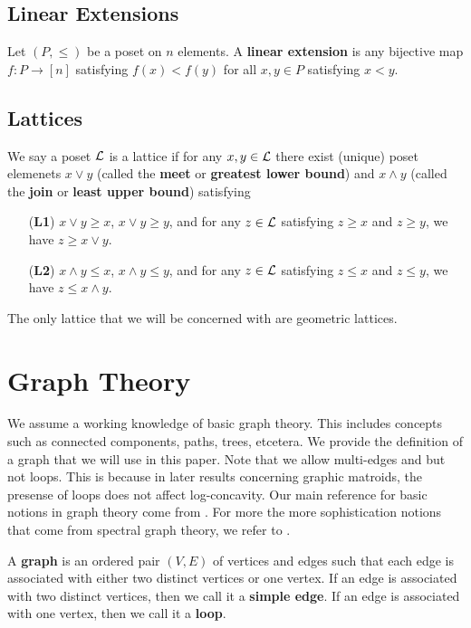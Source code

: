 \documentclass{puthesis-UG}
\begin{document}
\subsection{Linear Extensions}

\begin{defn}
	Let $(P, \leq)$ be a poset on $n$ elements. A \textbf{linear extension} is any bijective map $f : P \to [n]$ satisfying $f(x) < f(y)$ for all $x, y \in P$ satisfying $x < y$.
\end{defn}
\subsection{Lattices}

\begin{defn}
	We say a poset $\mathcal{L}$ is a lattice if for any $x, y \in \mathcal{L}$ there exist (unique) poset elemenets $x \vee y$ (called the \textbf{meet} or \textbf{greatest lower bound}) and $x \wedge y$ (called the \textbf{join} or \textbf{least upper bound}) satisfying 
	\begin{enumerate}
		\item[(\textbf{L1})] $x \vee y \geq x$, $x \vee y \geq y$, and for any $z \in \mathcal{L}$ satisfying $z \geq x$ and $z \geq y$, we have $z \geq x \vee y$. 
		\item[(\textbf{L2})] $x \wedge y \leq x$, $x \wedge y \leq y$, and for any $z \in \mathcal{L}$ satisfying $z \leq x$ and $z \leq y$, we have $z \leq x \wedge y$. 
	\end{enumerate}
\end{defn}

The only lattice that we will be concerned with are geometric lattices. 
\section{Graph Theory}

We assume a working knowledge of basic graph theory. This includes concepts such as connected components, paths, trees, etcetera. We provide the definition of a graph that we will use in this paper. Note that we allow multi-edges and but not loops. This is because in later results concerning graphic matroids, the presense of loops does not affect log-concavity. Our main reference for basic notions in graph theory come from \cite{diestel}. For more the more sophistication notions that come from spectral graph theory, we refer to \cite{chung-spectral-graph-theory}. 

\begin{defn}
	A \textbf{graph} is an ordered pair $(V, E)$ of vertices and edges such that each edge is associated with either two distinct vertices or one vertex. If an edge is associated with two distinct vertices, then we call it a \textbf{simple edge}. If an edge is associated with one vertex, then we call it a \textbf{loop}. 
\end{defn}
\end{document}
